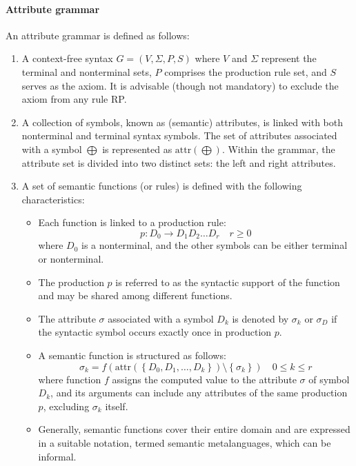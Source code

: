 \paragraph*{Attribute grammar}
An attribute grammar is defined as follows: 
\begin{enumerate}
    \item A context-free syntax $G = \left( V, \Sigma, P, S \right)$ where $V$ and $\Sigma$ represent the terminal and nonterminal sets, $P$ comprises the production rule set, and $S$ serves as the axiom. 
        It is advisable (though not mandatory) to exclude the axiom from any rule RP.
    \item A collection of symbols, known as (semantic) attributes, is linked with both nonterminal and terminal syntax symbols. 
        The set of attributes associated with a symbol $\bigoplus$ is represented as $\text{attr}\left( \bigoplus \right)$.
        Within the grammar, the attribute set is divided into two distinct sets: the left and right attributes.
    \item A set of semantic functions (or rules) is defined with the following characteristics:
        \begin{itemize}
            \item Each function is linked to a production rule:
                  \[ p: D_0 \rightarrow D_1 D_2 \ldots D_r \quad r \geq 0\]
                  where $D_0$ is a nonterminal, and the other symbols can be either terminal or nonterminal.
            \item The production $p$ is referred to as the syntactic support of the function and may be shared among different functions.
            \item The attribute $\sigma$ associated with a symbol $D_k$ is denoted by $\sigma_k$ or $\sigma_D$ if the syntactic symbol occurs exactly once in production $p$.
            \item A semantic function is structured as follows:
                  \[ \sigma_k = f \left( \text{attr} \left( \left\{ D_0, D_1, \ldots , D_k \right\} \right) \setminus \left\{ \sigma_k \right\}\right) \quad 0 \leq k \leq r \]
                  where function $f$ assigns the computed value to the attribute $\sigma$ of symbol $D_k$, and its arguments can include any attributes of the same production $p$, excluding $\sigma_k$ itself.
            \item Generally, semantic functions cover their entire domain and are expressed in a suitable notation, termed semantic metalanguages, which can be informal.

\end{itemize}
\end{enumerate}
